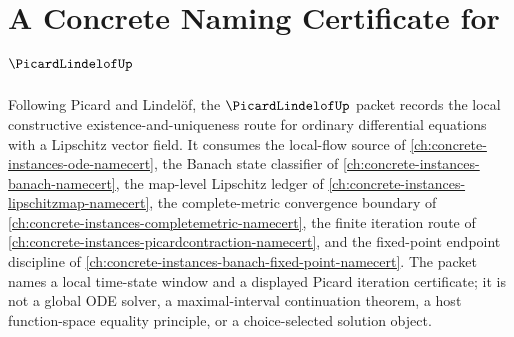 \chapter{A Concrete Naming Certificate for $\PicardLindelofUp$}
\label{ch:concrete-instances-picard-lindelof-namecert}

Following Picard and Lindelöf, the $\PicardLindelofUp$ packet records the local constructive existence-and-uniqueness route for ordinary differential equations with a Lipschitz vector field. It consumes the local-flow source of \autoref{ch:concrete-instances-ode-namecert}, the Banach state classifier of \autoref{ch:concrete-instances-banach-namecert}, the map-level Lipschitz ledger of \autoref{ch:concrete-instances-lipschitzmap-namecert}, the complete-metric convergence boundary of \autoref{ch:concrete-instances-completemetric-namecert}, the finite iteration route of \autoref{ch:concrete-instances-picardcontraction-namecert}, and the fixed-point endpoint discipline of \autoref{ch:concrete-instances-banach-fixed-point-namecert}. The packet names a local time-state window and a displayed Picard iteration certificate; it is not a global ODE solver, a maximal-interval continuation theorem, a host function-space equality principle, or a choice-selected solution object.

